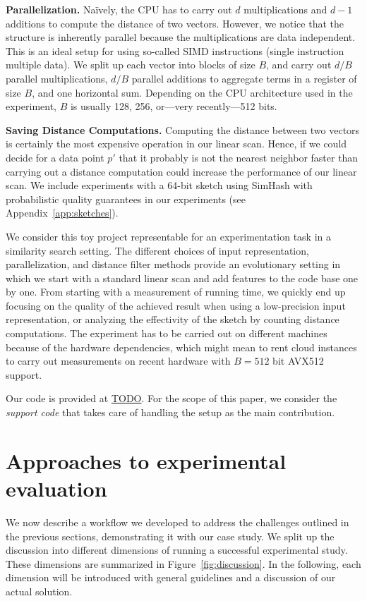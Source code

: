 \documentclass{llncs}
\newcommand{\myparagraph}[1]{\noindent \textbf{#1}}
\begin{document}
\myparagraph{Parallelization.}
Naïvely, the CPU has to carry out $d$ multiplications and $d-1$ additions to compute the distance of two vectors.
However, we notice that the structure is inherently parallel because the multiplications are data independent. This is an ideal setup for using so-called SIMD instructions (single instruction multiple data). 
We split up each vector into blocks of size $B$, and carry out $d/B$ parallel multiplications, $d/B$ parallel additions to aggregate terms in a register of size $B$, and one horizontal sum. 
Depending on the CPU architecture used in the experiment, $B$ is usually 128, 256, or---very recently---512 bits.

\myparagraph{Saving Distance Computations.} Computing the distance 
between two vectors is certainly the most expensive operation in our linear scan. 
Hence, if we could decide for a data point $p'$ that it probably is not the nearest neighbor faster than carrying out a distance computation could increase the performance of our linear scan. 
We include experiments with a 64-bit sketch using SimHash with probabilistic quality guarantees in our experiments (see Appendix~\ref{app:sketches}).

\medskip

We consider this toy project representable for an experimentation task in a similarity search setting. 
The different choices of input representation, parallelization, and distance filter methods provide an evolutionary setting in which we start with a standard linear scan and add features to the code base one by one. 
From starting with a measurement of running time, we quickly end up focusing on the quality of the achieved result when using a low-precision input representation, or analyzing the effectivity of the sketch by counting distance computations.
The experiment has to be carried out on different machines because of the hardware dependencies, which might mean to rent cloud instances to carry out measurements on recent hardware with $B = 512$ bit AVX512 support. 

Our code is provided at \url{TODO}. For the scope of this paper, we consider the \emph{support code} that takes care of handling the setup as the main contribution.  

\section{Approaches to experimental evaluation}
We now describe a workflow we developed to address the challenges outlined
in the previous sections, demonstrating it with our case study.
We split up the discussion into different dimensions of running 
a successful experimental study. 
These dimensions are summarized in Figure~\ref{fig:discussion}. 
In the following, each dimension will be introduced with general
guidelines and a discussion of our actual solution. 
\end{document}
